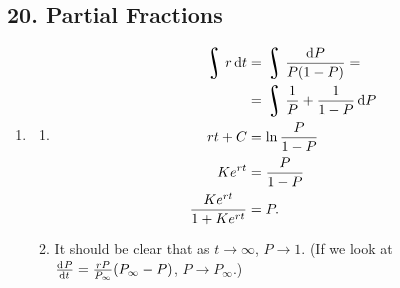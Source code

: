 \subsection*{20. Partial Fractions}
\begin{enumerate}
  \item
    \begin{enumerate}
      \item
        \begin{align*}
          \rint r \dif{t} &= \rint \frac{\dif{P}}{P(1 - P)} = \\
                          &= \rint \frac{1}{P} + \frac{1}{1 - P} \dif{P}\\
          rt + C &=  \ln\frac{P}{1 - P}\\
          Ke^{rt} &= \frac{P}{1 - P}\\
          \frac{Ke^{rt}}{1 + Ke^{rt}} &= P.
        \end{align*}
      \item It should be clear that as $ t \to \infty $, $ P \to 1 $. (If we look at $ \od{P}{t} = \frac{rP}{P_\infty}(P_\infty - P) $, $ P \to P_\infty $.)


\end{enumerate}
\end{enumerate}
